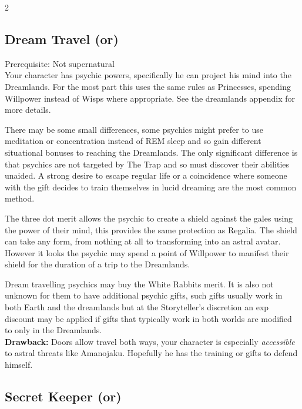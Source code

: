 \begin{multicols}{2}
\subsection*{Dream Travel (\textbullet\nobreak\hspace{.16667em}or\nobreak\hspace{.16667em}\textbullet\textbullet\textbullet)}

Prerequisite: Not supernatural\\

\noindent Your character has psychic powers, specifically he can project his mind into the Dreamlands. For the most part this uses the same rules as Princesses, spending Willpower instead of Wisps where appropriate. See the dreamlands appendix for more details. 

There may be some small differences, some psychics might prefer to use meditation or concentration instead of REM sleep and so gain different situational bonuses to reaching the Dreamlands. The only significant difference is that psychics are not targeted by The Trap and so must discover their abilities unaided. A strong desire to escape regular life or a coincidence where someone with the gift decides to train themselves in lucid dreaming are the most common method. 

The three dot merit allows the psychic to create a shield against the gales using the power of their mind, this provides the same protection as Regalia. The shield can take any form, from nothing at all to transforming into an astral avatar. However it looks the psychic may spend a point of Willpower to manifest their shield for the duration of a trip to the Dreamlands. 

Dream travelling psychics may buy the White Rabbits merit. It is also not unknown for them to have additional psychic gifts, such gifts usually work in both Earth and the dreamlands but at the Storyteller's discretion an exp discount may be applied if gifts that typically work in both worlds are modified to only in the Dreamlands. \\

\textbf{Drawback:} Doors allow travel both ways, your character is especially \textit{accessible} to astral threats like Amanojaku. Hopefully he has the training or gifts to defend himself.

\subsection*{Secret Keeper (\textbullet\textbullet\nobreak\hspace{.16667em}or\nobreak\hspace{.16667em}\textbullet\textbullet\textbullet)}


\end{multicols}
